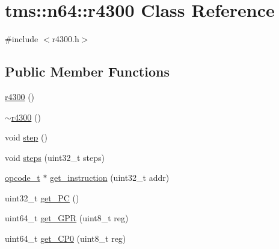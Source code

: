 \hypertarget{classtms_1_1n64_1_1r4300}{}\section{tms\+:\+:n64\+:\+:r4300 Class Reference}
\label{classtms_1_1n64_1_1r4300}


{\ttfamily \#include $<$r4300.\+h$>$}

\subsection*{Public Member Functions}
\begin{DoxyCompactItemize}
\item 
\hyperlink{classtms_1_1n64_1_1r4300_a39ac7ecb973328f1cae8dbb9d9ec4dd1}{r4300} ()
\item 
\hyperlink{classtms_1_1n64_1_1r4300_a0a7c3a69dcf964723aab0864ee68c6eb}{$\sim$r4300} ()
\item 
void \hyperlink{classtms_1_1n64_1_1r4300_aa683dd9de43d88b556a4c0c31a3326bf}{step} ()
\item 
void \hyperlink{classtms_1_1n64_1_1r4300_a206d793232017de674270ded7a7c0a12}{steps} (uint32\+\_\+t steps)
\item 
\hyperlink{classtms_1_1n64_1_1opcode__t}{opcode\+\_\+t} $\ast$ \hyperlink{classtms_1_1n64_1_1r4300_a6b81e087d3faf3066767ec3a20174bd2}{get\+\_\+instruction} (uint32\+\_\+t addr)
\item 
uint32\+\_\+t \hyperlink{classtms_1_1n64_1_1r4300_a59820c58f697bb5b247d8808252a343f}{get\+\_\+\+PC} ()
\item 
uint64\+\_\+t \hyperlink{classtms_1_1n64_1_1r4300_a51d4a3aac1182bcdc291fd5637d75d99}{get\+\_\+\+G\+PR} (uint8\+\_\+t reg)
\item 
uint64\+\_\+t \hyperlink{classtms_1_1n64_1_1r4300_a2e873d36829bed45630c8bf02b3a676c}{get\+\_\+\+C\+P0} (uint8\+\_\+t reg)
\end{DoxyCompactItemize}
